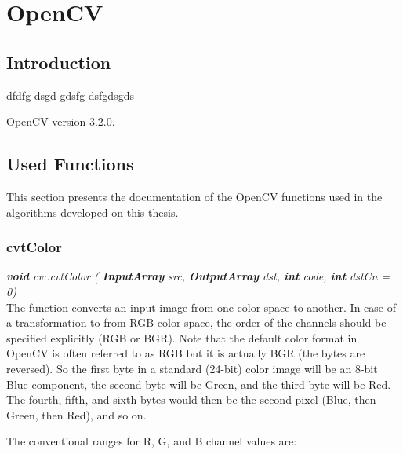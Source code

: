 \chapter{OpenCV}
\label{ann:opencv_functions}

\section{Introduction}
\label{sec:opencv_annex_introduction}


dfdfg dsgd gdsfg dsfgdsgds

OpenCV version 3.2.0.

\section{Used Functions}
\label{sec:opencv_annex_used_functions}

This section presents the documentation of the OpenCV functions used in the algorithms developed on this thesis.

\subsection*{cvtColor}
\label{subsec:opencv_annex_used_functions_cvtcolor}

\textit{\textbf{void} cv::cvtColor (
        \textbf{InputArray} src,
		\textbf{OutputArray}  	dst,
		\textbf{int}  	code,
		\textbf{int}  	dstCn = 0)}\\
		
The function converts an input image from one color space to another. In case of a transformation to-from RGB color space, the order of the channels should be specified explicitly (RGB or BGR). Note that the default color format in OpenCV is often referred to as RGB but it is actually BGR (the bytes are reversed). So the first byte in a standard (24-bit) color image will be an 8-bit Blue component, the second byte will be Green, and the third byte will be Red. The fourth, fifth, and sixth bytes would then be the second pixel (Blue, then Green, then Red), and so on.

The conventional ranges for R, G, and B channel values are:

